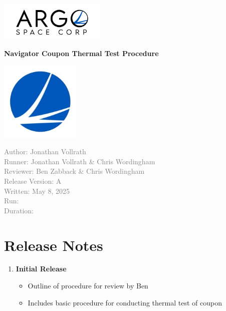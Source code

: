 \documentclass[11pt]{article}
\begin{document}
    \doublespacing
    \begin{titlepage}
        \centering

        \includegraphics[width=2in]{argo-space.jpg}

        \vspace*{1.5cm}
        \Huge
        \textbf{Navigator Coupon Thermal Test Procedure}

        \vfill

        \includegraphics[width = 1.5in]{argo_space_logo.jpg}

        \normalsize
        \textcolor{gray}{Author: Jonathan Vollrath} \\
        \textcolor{gray}{Runner: Jonathan Vollrath \& Chris Wordingham} \\
        \textcolor{gray}{Reviewer: Ben Zabback \& Chris Wordingham} \\
        \textcolor{gray}{Release Version: A} \\
        \textcolor{gray}{Written: May 8, 2025} \\
        \textcolor{gray}{Run: } \\
        \textcolor{gray}{Duration: }
    \end{titlepage}

    \section*{Release Notes}

        \begin{enumerate}[label=\Alph*.]
            \item \textbf{Initial Release}
            \begin{itemize}
                \item Outline of procedure for review by Ben
                \item Includes basic procedure for conducting thermal test of coupon
            \end{itemize}
        \end{enumerate}
\end{document}
